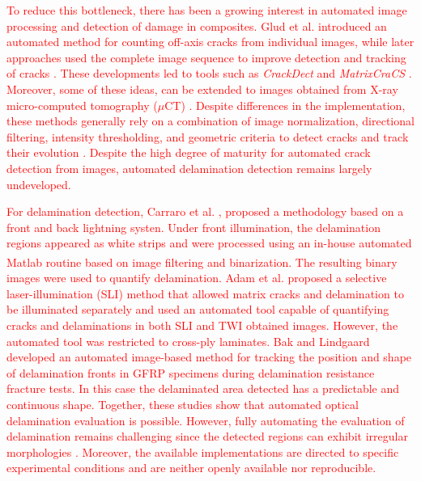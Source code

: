 \documentclass[final,5p,times]{elsarticle}
\newcommand{\revision}[1]{\textcolor{red}{#1}}
\begin{document}
	\revision{
		To reduce this bottleneck, there has been a growing interest in automated image processing and detection of damage in composites. Glud et al. \cite{gludAutomatedCountingOffaxis2016} introduced an automated method for counting off-axis cracks from individual images, while later approaches used the complete image sequence to improve detection and tracking of cracks \cite{gludAutomatedCountingOffaxis2016, benderEffectVariableAmplitude2021}. These developments led to tools such as \emph{CrackDect} \cite{drvodericVersion02CrackDect2022} and \emph{MatrixCraCS}  \cite{olesenMatrixCraCSAutomatedTracking2024}. Moreover, some of these ideas, can be extended to images obtained from X-ray micro-computed tomography ($\mu$CT) \cite{sketAutomaticQuantificationMatrix2014, salgadoAutomatedImageProcessing2026}. Despite differences in the implementation, these methods generally rely on a combination of image normalization, directional filtering, intensity thresholding, and geometric criteria to detect cracks and track their evolution \cite{gludAutomatedCountingOffaxis2016, benderEffectVariableAmplitude2021, drvodericVersion02CrackDect2022, olesenMatrixCraCSAutomatedTracking2024, JustKochGude2022}. Despite the high degree of maturity for automated crack detection from images, automated delamination detection remains largely undeveloped.}
	
	\revision{
		For delamination detection, Carraro et al. \cite{carraroCharacterisationAnalysisTransverse2019}, proposed a methodology based on a front and back lightning systen. Under front illumination, the delamination regions appeared as white strips and were processed using an in-house automated Matlab\textsuperscript{\textregistered} routine based on image filtering and binarization. The resulting binary images were used to quantify delamination. Adam et al. \cite{adamSelectiveLaserIllumination2018} proposed a selective laser-illumination (SLI) method that allowed matrix cracks and delamination to be illuminated separately and used an automated tool capable of quantifying cracks and delaminations in both SLI and TWI obtained images. However, the automated tool was restricted to cross-ply laminates. Bak and Lindgaard \cite{bakMethodAutomatedDigital2020} developed an automated image-based method for tracking the position and shape of delamination fronts in GFRP specimens during delamination resistance fracture tests. In this case the delaminated area detected has a predictable and continuous shape. Together, these studies show that automated optical delamination evaluation is possible. However, fully automating the evaluation of delamination remains challenging since the detected regions can exhibit irregular morphologies \cite{shenExperimentalInvestigationDamage2017, adamSelectiveLaserIllumination2018}. Moreover, the available implementations are directed to specific experimental conditions and are neither openly available nor reproducible.}
	
\end{document}

